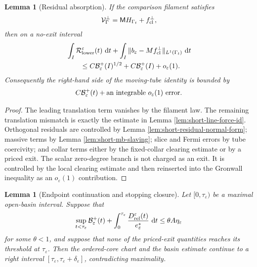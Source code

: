 \documentclass[11pt]{article}
\newtheorem{lemma}[theorem]{Lemma}
\theoremstyle{definition}
\newcommand{\dd}{\,\mathrm d}
\newcommand{\eps}{\varepsilon}
\newcommand{\estar}{e_\varepsilon^\ast}
\newcommand{\Basin}{\mathcal B}
\newcommand{\Mmob}{\mathsf M}
\newcommand{\Vrel}{\mathcal V}
\begin{document}
\begin{lemma}[Residual absorption]
\label{lem:short-residual-absorption}
If the comparison filament satisfies
\[
        \Vrel_\Gamma^\perp=\Mmob H_{\Gamma_t}+f_{\rm cl}^\perp ,
\]
then on a no-exit interval
\[
\begin{aligned}
&\int_I\mathcal R_{\rm lower}^\eps(t)\,\dd t
        +
        \int_I
        \|b_\eps-Mf_{\rm cl}^\perp\|_{L^1(\Gamma_t)}
        \,\dd t
\\
&\qquad\le
        C\Basin_\eps^+(I)^{1/2}
        +
        C\Basin_\eps^+(I)
        +
        o_\eps(1).
\end{aligned}
\]
Consequently the right-hand side of the moving-tube identity is bounded by
\[
        C\Basin_\eps^+(t)
        +
        \hbox{an integrable }o_\eps(1)\hbox{ error}.
\]
\end{lemma}

\begin{proof}
The leading translation term vanishes by the filament law.  The remaining
translation mismatch is exactly the estimate in Lemma
\ref{lem:short-line-force-id}.  Orthogonal residuals are controlled by Lemma
\ref{lem:short-residual-normal-form}; massive terms by Lemma
\ref{lem:short-mb-slaving}; slice and Fermi errors by tube coercivity; and
collar terms either by the fixed-collar clearing estimate or by a priced exit.
The scalar zero-degree branch is not charged as an exit.  It is controlled by
the local clearing estimate and then reinserted into the Gronwall inequality as
an \(o_\eps(1)\) contribution.
\end{proof}

\begin{lemma}[Endpoint continuation and stopping closure]
\label{lem:short-stopping}
Let \([0,\tau_\eps)\) be a maximal open-basin interval.  Suppose that
\[
        \sup_{t<\tau_\eps}\Basin_\eps^+(t)
        +
        \int_0^{\tau_\eps}
        \frac{D_{\rm rel}^\eps(t)}{\estar}\,\dd t
        \le
        \theta A\eta_\eps
\]
for some \(\theta<1\), and suppose that none of the priced-exit quantities reaches
its threshold at \(\tau_\eps\).  Then the ordered-core chart and the basin
estimate continue to a right interval
\([\tau_\eps,\tau_\eps+\delta_\eps]\), contradicting maximality.
\end{lemma}
\end{document}
